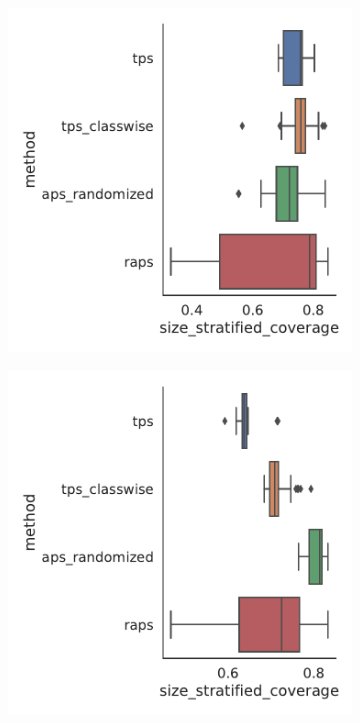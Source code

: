 \begin{figure}
    \begin{subfigure}{0.48\linewidth}
        \includegraphics[width=\linewidth,alt={Box plots for method comparison on Amazon Photos dataset size stratified coverage with 10 samples per class.}]{graphConformal/figures/nspc/amazon_photos_10_size_stratified_coverage.png}
    \end{subfigure}
    \begin{subfigure}{0.48\linewidth}
        \includegraphics[width=\linewidth,alt={Box plots for method comparison on Amazon Photos dataset size stratified coverage with 40 samples per class.}]{graphConformal/figures/nspc/amazon_photos_40_size_stratified_coverage.png}

\end{subfigure}
\end{figure}

